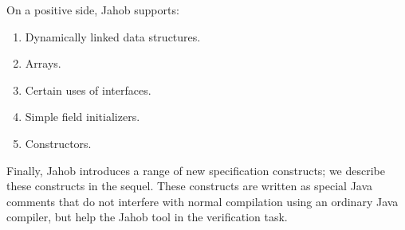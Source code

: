 On a positive side, Jahob supports:
\begin{enumerate}
\item Dynamically linked data structures.
\item Arrays.
\item Certain uses of interfaces.
\item Simple field initializers.
\item Constructors.
\end{enumerate}

Finally, Jahob introduces a range of new specification constructs; we
describe these constructs in the sequel.  These constructs are written
as special Java comments that do not interfere with normal compilation
using an ordinary Java compiler, but help the Jahob tool in the
verification task.
